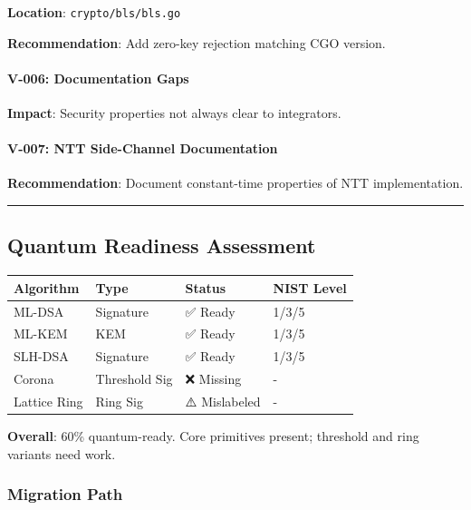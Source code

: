 \documentclass[
]{article}
\newcounter{none} %
\begin{document}
\textbf{Location}: \texttt{crypto/bls/bls.go}

\textbf{Recommendation}: Add zero-key rejection matching CGO version.

\paragraph{V-006: Documentation Gaps}\label{v-006-documentation-gaps}

\textbf{Impact}: Security properties not always clear to integrators.

\paragraph{V-007: NTT Side-Channel
Documentation}\label{v-007-ntt-side-channel-documentation}

\textbf{Recommendation}: Document constant-time properties of NTT
implementation.

\begin{center}\rule{0.5\linewidth}{0.5pt}\end{center}

\subsection{Quantum Readiness
Assessment}\label{quantum-readiness-assessment}

{\def\LTcaptype{none} %
\begin{longtable}[]{@{}llll@{}}
\toprule\noalign{}
Algorithm & Type & Status & NIST Level \\
\midrule\noalign{}
\endhead
\bottomrule\noalign{}
\endlastfoot
ML-DSA & Signature & ✅ Ready & 1/3/5 \\
ML-KEM & KEM & ✅ Ready & 1/3/5 \\
SLH-DSA & Signature & ✅ Ready & 1/3/5 \\
Corona & Threshold Sig & ❌ Missing & - \\
Lattice Ring & Ring Sig & ⚠️ Mislabeled & - \\
\end{longtable}
}

\textbf{Overall}: 60\% quantum-ready. Core primitives present; threshold
and ring variants need work.

\subsubsection{Migration Path}\label{migration-path}
\end{document}
